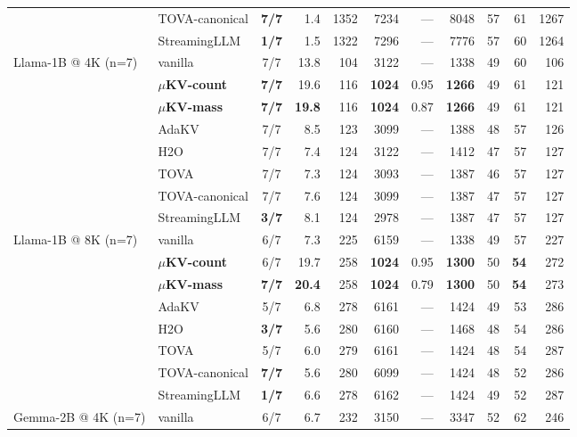 \documentclass[sigconf, anonymous=false, screen=true]{acmart}
\newcommand{\good}[1]{\textcolor{kvgreen}{\textbf{#1}}}
\newcommand{\bad}[1]{\textcolor{kvred}{\textbf{#1}}}
\begin{document}
\begin{table}[tp]
\begin{tabular}{l l c r r r r r r r r}
 & TOVA-canonical       & \good{7/7} &  1.4 & 1352 & 7234 & ---  & 8048 & 57 & 61 & 1267 \\
 & StreamingLLM         & \bad{1/7} &  1.5 & 1322 & 7296 & ---  & 7776 & 57 & 60 & 1264 \\
\midrule
\multirow{8}{*}{Llama-1B @ 4K (n=7)}
 & vanilla              & 7/7 & 13.8 &  104 & 3122 & ---  & 1338 & 49 & 60 &  106 \\
 & \textbf{$\mu$KV-count} & \good{7/7} & 19.6 &  116 & \good{1024} & 0.95 & \good{1266} & 49 & 61 &  121 \\
 & \textbf{$\mu$KV-mass}  & \good{7/7} & \good{19.8} &  116 & \good{1024} & 0.87 & \good{1266} & 49 & 61 &  121 \\
 & AdaKV                & 7/7 &  8.5 &  123 & 3099 & ---  & 1388 & 48 & 57 &  126 \\
 & H2O                  & 7/7 &  7.4 &  124 & 3122 & ---  & 1412 & 47 & 57 &  127 \\
 & TOVA                 & 7/7 &  7.3 &  124 & 3093 & ---  & 1387 & 46 & 57 &  127 \\
 & TOVA-canonical       & 7/7 &  7.6 &  124 & 3099 & ---  & 1387 & 47 & 57 &  127 \\
 & StreamingLLM         & \bad{3/7} &  8.1 &  124 & 2978 & ---  & 1387 & 47 & 57 &  127 \\
\midrule
\multirow{8}{*}{Llama-1B @ 8K (n=7)}
 & vanilla              & 6/7 &  7.3 &  225 & 6159 & ---  & 1338 & 49 & 57 &  227 \\
 & \textbf{$\mu$KV-count} & 6/7 & 19.7 &  258 & \good{1024} & 0.95 & \good{1300} & 50 & \good{54} &  272 \\
 & \textbf{$\mu$KV-mass}  & \good{7/7} & \good{20.4} &  258 & \good{1024} & 0.79 & \good{1300} & 50 & \good{54} &  273 \\
 & AdaKV                & 5/7 &  6.8 &  278 & 6161 & ---  & 1424 & 49 & 53 &  286 \\
 & H2O                  & \bad{3/7} &  5.6 &  280 & 6160 & ---  & 1468 & 48 & 54 &  286 \\
 & TOVA                 & 5/7 &  6.0 &  279 & 6161 & ---  & 1424 & 48 & 54 &  287 \\
 & TOVA-canonical       & \good{7/7} &  5.6 &  280 & 6099 & ---  & 1424 & 48 & 52 &  286 \\
 & StreamingLLM         & \bad{1/7} &  6.6 &  278 & 6162 & ---  & 1424 & 49 & 52 &  287 \\
\midrule
\multirow{8}{*}{Gemma-2B @ 4K (n=7)}
 & vanilla              & 6/7 &  6.7 &  232 & 3150 & ---  & 3347 & 52 & 62 &  246 \\

\end{tabular}
\end{table}
\end{document}
